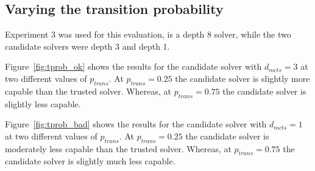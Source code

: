\subsection{Varying the transition probability}
Experiment 3 was used for this evaluation, \solverstar{} is a depth 8 solver, while the two candidate solvers were depth 3 and depth 1.

Figure~\ref{fig:tprob_ok} shows the results for the candidate solver with $d_{mcts}=3$ at two different values of $p_{trans}$. At $p_{trans}=0.25$ the candidate solver is slightly more capable than the trusted solver. Whereas, at $p_{trans}=0.75$ the candidate solver is slightly less capable.

Figure~\ref{fig:tprob_bad} shows the results for the candidate solver with $d_{mcts}=1$ at two different values of $p_{trans}$. At $p_{trans}=0.25$ the candidate solver is moderately less capable than the trusted solver. Whereas, at $p_{trans}=0.75$ the candidate solver is slightly much less capable.


